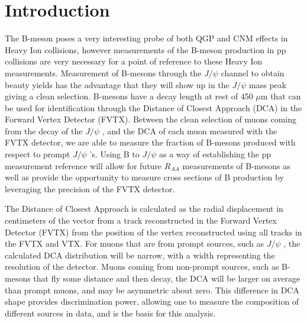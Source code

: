 \documentclass[12pt]{article}
\newcommand{\pt}{$p_{T}$ }
\newcommand{\jpsi}{$J/\psi$ }
\begin{document}
\tableofcontents

\newpage

\section{Introduction}

The B-meson poses a very interesting probe of both QGP and CNM effects in Heavy Ion collisions, however measurements of the B-meson production in pp collisions 
are very necessary for a point of reference to these Heavy Ion measurements. 
Measurement of B-mesons through the \jpsi channel to obtain beauty yields has the advantage that they will show up in the \jpsi mass peak giving a clean selection.
B-mesons have a decay length at rest of 450 $\mu$m that can be used for identification through the Distance of Closest Approach (DCA) in the Forward Vertex Detector (FVTX). 
Between the clean selection of muons coming from the decay of the \jpsi, and the DCA of each muon measured with the FVTX detector, we are able to measure the fraction of 
B-mesons produced with respect to prompt \jpsi's. Using B to \jpsi as a way of establishing the pp measurement reference will allow for future $R_{AA}$ measurements 
of B-mesons as well as provide the opportunity to measure cross sections of B production by leveraging the precision of the FVTX detector.

The Distance of Closest Approach is calculated as the radial displacement in centimeters
of the vector from a track reconstructed in the Forward Vertex Detector (FVTX) from the position of the 
vertex reconstructed using all tracks in the FVTX and VTX.  For muons that are from prompt sources,
such as \jpsi, the calculated DCA distribution will be narrow, with a width representing the resolution of the 
detector.  Muons coming from non-prompt sources, such as B-mesons that fly some distance and then decay,
the DCA will be larger on average than prompt muons, and may be asymmetric about zero.  This difference in
DCA shape provides discrimination power, allowing one to measure the composition of different sources in data,
and is the basis for this analysis.

\end{document}
